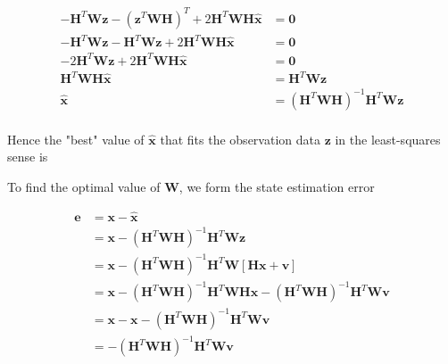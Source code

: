 \begin{equation*}
    \begin{aligned}
        - \mathbf{H}^T \mathbf{W} \mathbf{z}
        -  \left( \mathbf{z}^T \mathbf{W} \mathbf{H} \right)^T
        + 2 \mathbf{H}^T \mathbf{W} \mathbf{H} \hat{\mathbf{x}}
        &= \mathbf{0} \\
        - \mathbf{H}^T \mathbf{W} \mathbf{z}
        - \mathbf{H}^T \mathbf{W} \mathbf{z}
        + 2 \mathbf{H}^T \mathbf{W} \mathbf{H} \hat{\mathbf{x}}
        &= \mathbf{0} \\
        - 2 \mathbf{H}^T \mathbf{W} \mathbf{z}
        + 2 \mathbf{H}^T \mathbf{W} \mathbf{H} \hat{\mathbf{x}}
        &= \mathbf{0} \\
        \mathbf{H}^T \mathbf{W} \mathbf{H} \hat{\mathbf{x}} &= \mathbf{H}^T \mathbf{W} \mathbf{z} \\
        \hat{\mathbf{x}} &= \left( \mathbf{H}^T \mathbf{W} \mathbf{H} \right)^{-1} \mathbf{H}^T \mathbf{W} \mathbf{z} \\
    \end{aligned}
\end{equation*}

Hence the "best" value of $\hat{\mathbf{x}}$ that fits the observation data $\mathbf{z}$
in the least-squares sense is


To find the optimal value of $\mathbf{W}$, we form the state estimation error

\begin{equation*}
    \begin{aligned}
        \mathbf{e} &= \mathbf{x} - \hat{\mathbf{x}} \\
        &= \mathbf{x} - \left( \mathbf{H}^T \mathbf{W} \mathbf{H} \right)^{-1} \mathbf{H}^T \mathbf{W} \mathbf{z} \\
        &= \mathbf{x} - \left( \mathbf{H}^T \mathbf{W} \mathbf{H} \right)^{-1} \mathbf{H}^T \mathbf{W} \left[ \mathbf{H} \mathbf{x} + \mathbf{v} \right] \\
        &= \mathbf{x}
           - \left( \mathbf{H}^T \mathbf{W} \mathbf{H} \right)^{-1} \mathbf{H}^T \mathbf{W} \mathbf{H} \mathbf{x}
           - \left( \mathbf{H}^T \mathbf{W} \mathbf{H} \right)^{-1} \mathbf{H}^T \mathbf{W} \mathbf{v} \\
        &= \mathbf{x} - \mathbf{x}
           - \left( \mathbf{H}^T \mathbf{W} \mathbf{H} \right)^{-1} \mathbf{H}^T \mathbf{W} \mathbf{v} \\
        &= - \left( \mathbf{H}^T \mathbf{W} \mathbf{H} \right)^{-1} \mathbf{H}^T \mathbf{W} \mathbf{v} \\
    \end{aligned}
\end{equation*}

